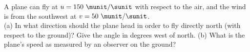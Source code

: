 A plane can fly at $u=150\ \munit/\sunit$ with respect to the air, and
the wind is from the southwest at
$v = 50\ \munit/\sunit$.\\
%
(a) In what direction should the plane head in order to fly directly
north (with respect to the ground)? Give the angle in degrees west of
north.\answercheck\hwendpart
%
(b) What is the plane's speed as measured by an observer on the
ground?\answercheck
